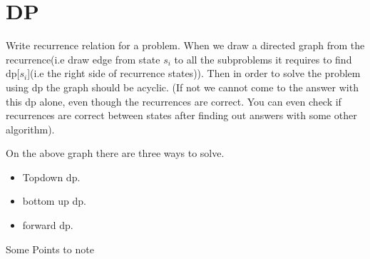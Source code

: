 \documentclass[../Notes.tex]{subfiles}
\begin{document}
\chapter{DP}

Write recurrence relation for a problem. When we draw a directed graph from the recurrence(i.e draw edge from state $s_i$ to all the subproblems it requires to find dp[$s_i$](i.e the right side of recurrence states)). Then in order to solve the problem using dp the graph should be acyclic. (If not we cannot come to the answer with this dp alone, even though the recurrences are correct. You can even check if recurrences are correct between states after finding out answers with some other algorithm).

On the above graph there are three ways to solve.
\begin{itemize}
	\item Topdown dp.
	\item bottom up dp.
	\item forward dp.
\end{itemize}	
Some Points to note
\end{document}
